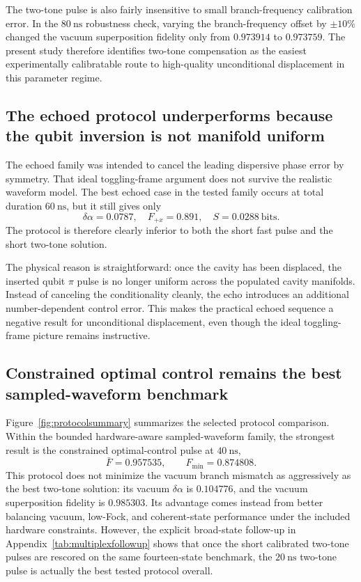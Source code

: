 \documentclass[aps,pra,twocolumn,reprint,floatfix,amsmath,amssymb]{revtex4-2}
\begin{document}
The two-tone pulse is also fairly insensitive to small branch-frequency calibration error. In the \(\SI{80}{\nano\second}\) robustness check, varying the branch-frequency offset by \(\pm 10\%\) changed the vacuum superposition fidelity only from \(0.973914\) to \(0.973759\). The present study therefore identifies two-tone compensation as the easiest experimentally calibratable route to high-quality unconditional displacement in this parameter regime.

\subsection{The echoed protocol underperforms because the qubit inversion is not manifold uniform}

The echoed family was intended to cancel the leading dispersive phase error by symmetry. That ideal toggling-frame argument does not survive the realistic waveform model. The best echoed case in the tested family occurs at total duration \(\SI{60}{\nano\second}\), but it still gives only
\begin{equation}
\delta\alpha = 0.0787,\quad F_{+x}=0.891,\quad S=0.0288\ \mathrm{bits}.
\end{equation}
The protocol is therefore clearly inferior to both the short fast pulse and the short two-tone solution.

The physical reason is straightforward: once the cavity has been displaced, the inserted qubit \(\pi\) pulse is no longer uniform across the populated cavity manifolds. Instead of canceling the conditionality cleanly, the echo introduces an additional number-dependent control error. This makes the practical echoed sequence a negative result for unconditional displacement, even though the ideal toggling-frame picture remains instructive.

\subsection{Constrained optimal control remains the best sampled-waveform benchmark}

Figure~\ref{fig:protocolsummary} summarizes the selected protocol comparison. Within the bounded hardware-aware sampled-waveform family, the strongest result is the constrained optimal-control pulse at \(\SI{40}{\nano\second}\),
\begin{equation}
\bar{F} = 0.957535,\qquad F_{\min}=0.874808.
\end{equation}
This protocol does not minimize the vacuum branch mismatch as aggressively as the best two-tone solution: its vacuum \(\delta\alpha\) is \(0.104776\), and the vacuum superposition fidelity is \(0.985303\). Its advantage comes instead from better balancing vacuum, low-Fock, and coherent-state performance under the included hardware constraints. However, the explicit broad-state follow-up in Appendix~\ref{tab:multiplexfollowup} shows that once the short calibrated two-tone pulses are rescored on the same fourteen-state benchmark, the \(\SI{20}{\nano\second}\) two-tone pulse is actually the best tested protocol overall.
\end{document}
